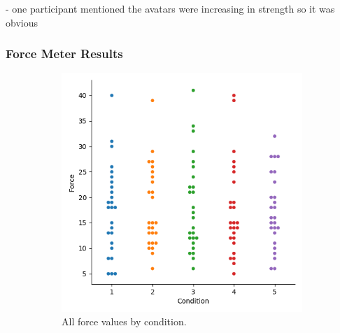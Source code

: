 - one participant mentioned the avatars were increasing in strength so it was obvious

\subsubsection{Force Meter Results}
\begin{figure}[H]
\hspace*{\fill}
     \begin{subfigure}[b]{0.4\textwidth}
         \centering
         \vspace*{-10mm}
         \includegraphics[width=\textwidth]{Files/Plots/force_by_cond_swarm.png}
         \caption{All force values by condition.}
         \label{fig:allForceSwarm}
     \end{subfigure}
     \hspace*{\fill}
     \begin{subfigure}[b]{0.4\textwidth}
         \centering

\end{subfigure}
\end{figure}
